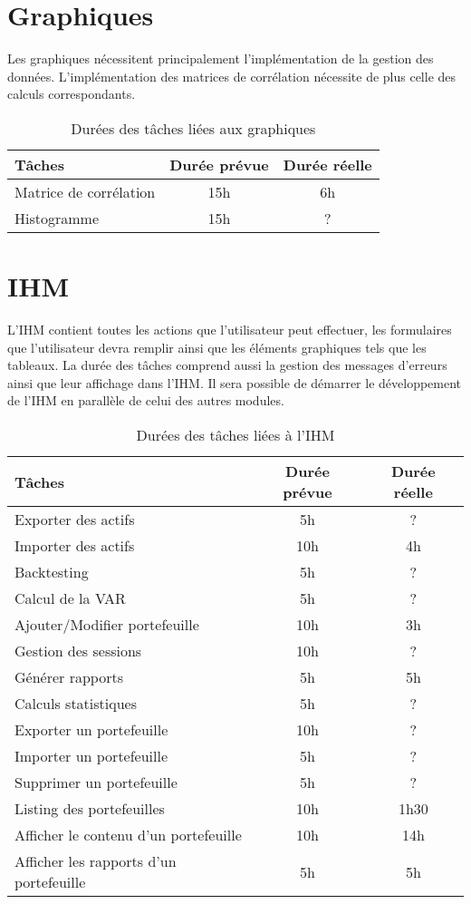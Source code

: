 \documentclass[a4paper]{report}
\begin{document}
\section{Graphiques}
Les graphiques nécessitent principalement l'implémentation de la gestion des données.
L'implémentation des matrices de corrélation nécessite de plus celle des calculs correspondants.

\begin{table}[H]
\centering
  \begin{tabularx}{0.8\textwidth}{| X | c | c |}
    \hline
	Tâches & Durée prévue & Durée réelle \\
    \hline
    Matrice de corrélation &  15h & 6h\\
    Histogramme &  15h & ?\\
    \hline
  \end{tabularx}
  \caption{Durées des tâches liées aux graphiques}
\end{table}


\section{IHM}
L'IHM contient toutes les actions que l'utilisateur peut effectuer, les formulaires que l'utilisateur devra remplir ainsi que les éléments graphiques tels que les tableaux.
La durée des tâches comprend aussi la gestion des messages d'erreurs ainsi que leur affichage dans l'IHM.
Il sera possible de démarrer le développement de l'IHM en parallèle de celui des autres modules.

\begin{table}[H]
\centering
  \begin{tabularx}{0.8\textwidth}{| X | c | c |}
    \hline
	Tâches & Durée prévue & Durée réelle \\
    \hline
    Exporter des actifs & 5h & ?\\
    Importer des actifs & 10h & 4h\\
    Backtesting & 5h & ?\\
    Calcul de la VAR & 5h & ?\\
    Ajouter/Modifier portefeuille & 10h & 3h\\
    Gestion des sessions & 10h & ?\\
    Générer rapports & 5h & 5h\\
    Calculs statistiques & 5h & ?\\
    Exporter un portefeuille & 10h & ?\\
    Importer un portefeuille & 5h & ?\\
    Supprimer un portefeuille & 5h & ?\\
    Listing des portefeuilles & 10h & 1h30\\
    Afficher le contenu d'un portefeuille & 10h & 14h\\
    Afficher les rapports d'un portefeuille & 5h & 5h\\
    \hline
  \end{tabularx}
  \caption{Durées des tâches liées à l'IHM}
\end{table}
\end{document}
